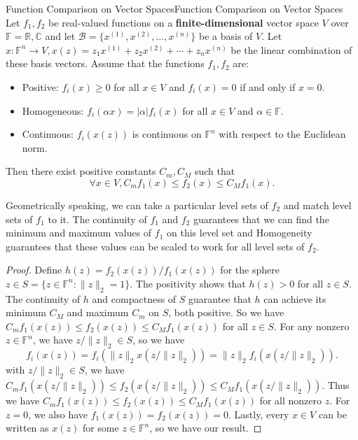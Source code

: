 \documentclass[../main.tex]{subfiles}
\begin{document}
\begin{theorem}{Function Comparison on Vector Spaces}{Function Comparison on Vector Spaces}
  Let $f_1,f_2$ be real-valued functions on a \textbf{finite-dimensional} vector space $V$ over $\mathbb{F} = \mathbb{R}, \mathbb{C}$ and let $\mathcal{B} = \{x^{(1)}, x^{(2)}, \ldots, x^{(n)}\}$ be a basis of $V$. Let $x: \mathbb{F}^n \to V, x(z) = z_1 x^{(1)} + z_2 x^{(2)} + \cdots + z_n x^{(n)}$ be the linear combination of these basis vectors. Assume that the functions $f_1,f_2$ are:
  \begin{itemize}
    \item Positive: $f_i(x) \geq 0$ for all $x \in V$ and $f_i(x) = 0$ if and only if $x = 0$.
    \item Homogeneous: $f_i(\alpha x) = |\alpha| f_i(x)$ for all $x \in V$ and $\alpha \in \mathbb{F}$.
    \item Continuous: $f_i(x(z))$ is continuous on $\mathbb{F}^n$ with respect to the Euclidean norm.
  \end{itemize}
  Then there exist positive constants $C_m, C_M$ such that
  \begin{equation*}
    \forall x \in V, C_m f_1(x) \leq f_2(x) \leq C_M f_1(x).
  \end{equation*}
\end{theorem}

Geometrically speaking, we can take a particular level sets of $f_2$ and match level sets of $f_1$ to it. The continuity of $f_1$ and $f_2$ guarantees that we can find the minimum and maximum values of $f_1$ on this level set and Homogeneity guarantees that these values can be scaled to work for all level sets of $f_2$.

\begin{proof}
  Define $h(z) = f_2(x(z)) / f_1(x(z))$ for the sphere $z \in S = \{z \in \mathbb{F}^n: \|z\|_2 = 1\}$. The positivity shows that $h(z) > 0$ for all $z \in S$. The continuity of $h$ and compactness of $S$ guarantee that $h$ can achieve its minimum $C_M$ and maximum $C_m$ on $S$, both positive. So we have $C_m f_1(x(z)) \leq f_2(x(z)) \leq C_M f_1(x(z))$ for all $z \in S$. For any nonzero $z\in \mathbb{F}^n$, we have $z / \|z\|_2 \in S$, so we have
  \begin{equation*}
    f_i(x(z)) = f_i(\|z\|_2 x(z / \|z\|_2)) = \|z\|_2 f_i(x(z / \|z\|_2)).
  \end{equation*}
  with $z / \|z\|_2 \in S$, we have $C_m f_1(x(z / \|z\|_2)) \leq f_2(x(z / \|z\|_2)) \leq C_M f_1(x(z / \|z\|_2))$. Thus we have $C_m f_1(x(z)) \leq f_2(x(z)) \leq C_M f_1(x(z))$ for all nonzero $z$. For $z = 0$, we also have $f_1(x(z)) = f_2(x(z)) = 0$. Lastly, every $x \in V$ can be written as $x(z)$ for some $z \in \mathbb{F}^n$, so we have our result.
\end{proof}
\end{document}
